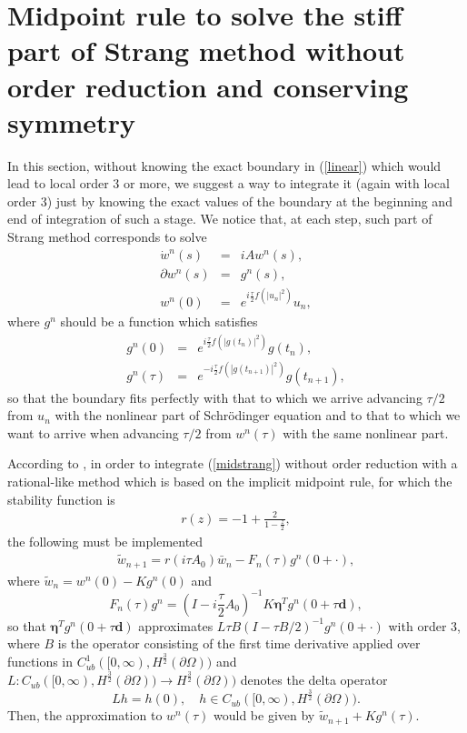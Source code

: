 \documentclass[10pt,a4paper]{amsart}
\begin{document}
\section{Midpoint rule to solve the stiff part of Strang method without order reduction and conserving symmetry}

In this section, without knowing the exact boundary in (\ref{linear}) which would lead to local order $3$ or more, we suggest a way to integrate it (again with local order $3$) just by knowing the exact values of the boundary at the beginning and end of integration of such a stage.
We notice that, at each step, such part of Strang method corresponds to solve
\begin{eqnarray}
\dot{w}^n(s)&=&i A w^n(s), \nonumber \\
\partial w^n(s)&=& g^n(s), \nonumber \\
w^n(0)&=& e^{i \frac{\tau}{2}f(|u_n|^2)} u_n, \label{midstrang}
\end{eqnarray}
where $g^n$ should be a function which satisfies
\begin{eqnarray}
g^n(0)&=& e^{i \frac{\tau}{2}f(|g(t_n)|^2)} g(t_n), \nonumber \\
g^n(\tau)&=& e^{-i \frac{\tau}{2}f(|g(t_{n+1})|^2)} g(t_{n+1}), \label{known}
\end{eqnarray}
so that the boundary fits perfectly with that to which we arrive advancing $\tau/2$ from $u_n$ with the nonlinear part of Schr\"odinger equation and to that to which we want to arrive when advancing $\tau/2$ from $w^n(\tau)$ with the same nonlinear part.

According to \cite{ACP}, in order to integrate (\ref{midstrang}) without order reduction with a rational-like method which is based on the implicit midpoint rule, for which the stability function is
\begin{eqnarray}
r(z)=-1+\frac{2}{1-\frac{z}{2}},
\label{r}
\end{eqnarray}
the following must be implemented
\begin{eqnarray}
\tilde{w}_{n+1}= r(i \tau A_0) \bar{w}_n- F_n(\tau)g^n(0+\cdot),  \nonumber
\end{eqnarray}
where $\tilde{w}_n=w^n(0)-K g^n(0)$ and
$$F_n(\tau) g^n =(I-i \frac{\tau}{2}A_0)^{-1} K \boldsymbol{\eta}^T  g^n(0+\tau \mathbf{d}),$$
so that
$\boldsymbol{\eta}^T g^n(0+\tau \mathbf{d})$ approximates $L\tau B (I- \tau B/2)^{-1} g^n(0+\cdot)$ with order $3$, where $B$ is the operator consisting of the first time derivative applied over functions in $C^1_{ub}([0,\infty), H^{\frac{3}{2}}(\partial \Omega))$ and $L: C_{ub}([0,\infty),H^{\frac{3}{2}}(\partial \Omega))\to H^{\frac{3}{2}}(\partial \Omega))$ denotes the delta operator
$$L h= h(0), \quad h \in C_{ub}([0,\infty),H^{\frac{3}{2}}(\partial \Omega)).$$
Then, the approximation to $w^n(\tau)$ would be given by $\tilde{w}_{n+1}+ K g^n(\tau)$.
\end{document}
